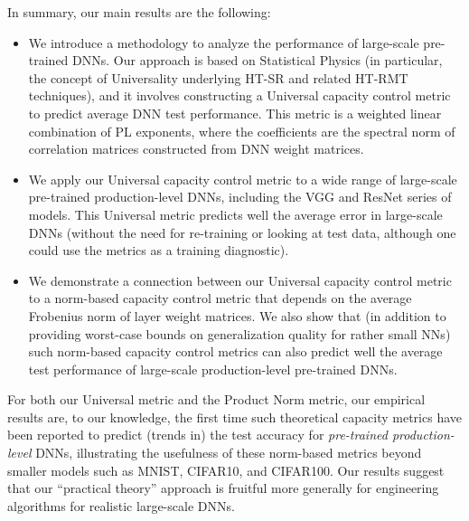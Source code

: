 In summary, our main results are the following:
\begin{itemize}
\item
We introduce a methodology to analyze the performance of large-scale pre-trained DNNs.
Our approach is based on Statistical Physics (in particular, the concept of Universality underlying HT-SR and related HT-RMT techniques), and it involves constructing a Universal capacity control metric to predict average DNN test performance.
This metric is a weighted linear combination of PL exponents, where the coefficients are the spectral norm of correlation matrices constructed from DNN weight matrices.
\item
We apply our Universal capacity control metric to a wide range of large-scale pre-trained production-level DNNs, including the VGG and ResNet series of models.
This Universal metric predicts well the average error in large-scale DNNs (without the need for re-training or looking at test data, although one could use the metrics as a training diagnostic).
\item
We demonstrate a connection between our Universal capacity control metric to a norm-based capacity control metric that depends on the average Frobenius norm of layer weight matrices.
We also show that (in addition to providing worst-case bounds on generalization quality for rather small NNs) such norm-based capacity control metrics can also predict well the average test performance of large-scale production-level pre-trained DNNs.
\end{itemize}
For both our Universal metric and the Product Norm metric, our empirical results are, to our knowledge, the first time such theoretical capacity metrics have been reported to predict (trends in) the test accuracy for \emph{pre-trained production-level} DNNs, illustrating the usefulness of these norm-based metrics beyond smaller models such as MNIST, CIFAR10, and CIFAR100. 
Our results suggest that our ``practical theory'' approach is fruitful more generally for engineering algorithms for realistic large-scale DNNs.


